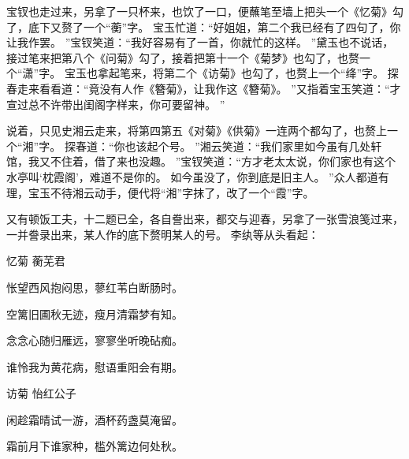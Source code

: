 \par
宝钗也走过来，另拿了一只杯来，也饮了一口，便蘸笔至墙上把头一个《忆菊》勾了，底下又赘了一个“蘅”字。
宝玉忙道：“好姐姐，第二个我已经有了四句了，你让我作罢。
”宝钗笑道：“我好容易有了一首，你就忙的这样。
”黛玉也不说话，接过笔来把第八个《问菊》勾了，接着把第十一个《菊梦》也勾了，也赘一个“潇”字。
宝玉也拿起笔来，将第二个《访菊》也勾了，也赘上一个“绛”字。
探春走来看看道：“竟没有人作《簪菊》，让我作这《簪菊》。
”又指着宝玉笑道：“才宣过总不许带出闺阁字样来，你可要留神。
”\par
说着，只见史湘云走来，将第四第五《对菊》《供菊》一连两个都勾了，也赘上一个“湘”字。
探春道：“你也该起个号。
”湘云笑道：“我们家里如今虽有几处轩馆，我又不住着，借了来也没趣。
”宝钗笑道：“方才老太太说，你们家也有这个水亭叫‘枕霞阁’，难道不是你的。
如今虽没了，你到底是旧主人。
”众人都道有理，宝玉不待湘云动手，便代将“湘”字抹了，改了一个“霞”字。
\par
又有顿饭工夫，十二题已全，各自誊出来，都交与迎春，另拿了一张雪浪笺过来，一并誊录出来，某人作的底下赘明某人的号。
李纨等从头看起：\par
\hop
忆菊 \quad 蘅芜君\par
怅望西风抱闷思，蓼红苇白断肠时。
\par
空篱旧圃秋无迹，瘦月清霜梦有知。
\par
念念心随归雁远，寥寥坐听晚砧痴。
\par
谁怜我为黄花病，慰语重阳会有期。
\par
\hop
访菊 \quad 怡红公子\par
闲趁霜晴试一游，酒杯药盏莫淹留。
\par
霜前月下谁家种，槛外篱边何处秋。
\par
